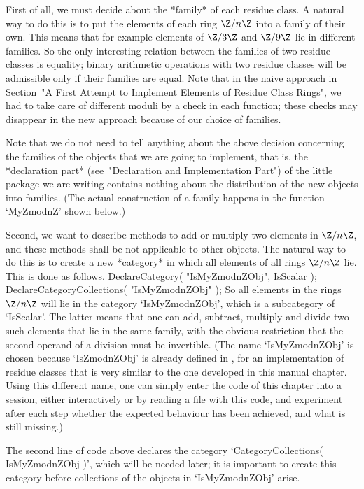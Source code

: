 First of all, we must decide about the *family* of each residue class.
A natural way to do this is to put the elements of each ring $\Z/n\Z$
into a family of their own.
This means that for example elements of $\Z/3\Z$ and $\Z/9\Z$ lie
in different families.
So the only interesting relation between the families of two residue
classes is equality;
binary arithmetic operations with two residue classes will be admissible
only if their families are equal.
Note that in the naive approach in Section~"A First Attempt to Implement
Elements of Residue Class Rings",
we had to take care of different moduli by a check in each function;
these checks may disappear in the new approach because of our choice
of families.

Note that we do not need to tell {\GAP} anything about the above
decision concerning the families of the objects that we are going to
implement,
that is, the *declaration part* (see~"Declaration and Implementation Part")
of the little {\GAP} package we are writing contains nothing about the
distribution of the new objects into families.
(The actual construction of a family happens in the function `MyZmodnZ'
shown below.)

Second, we want to describe methods to add or multiply two elements in
$\Z/n\Z$,
and these methods shall be not applicable to other {\GAP} objects.
The natural way to do this is to create a new *category* in which all
elements of all rings $\Z/n\Z$ lie.
This is done as follows.
\begintt
DeclareCategory( "IsMyZmodnZObj", IsScalar );
DeclareCategoryCollections( "IsMyZmodnZObj" );
\endtt
So all elements in the rings $\Z/n\Z$ will lie in the category
`IsMyZmodnZObj', which is a subcategory of `IsScalar'.
The latter means that one can add, subtract, multiply and divide
two such elements that lie in the same family,
with the obvious restriction that the second operand of a division
must be invertible.
(The name `IsMyZmodnZObj' is chosen because `IsZmodnZObj' is already
defined in {\GAP}, for an implementation of residue classes that is
very similar to the one developed in this manual chapter.
Using this different name, one can simply enter the {\GAP} code of this
chapter into a {\GAP} session, either interactively or by reading a file
with this code, and experiment after each step whether the expected
behaviour has been achieved, and what is still missing.)

The second line of {\GAP} code above declares the category
`CategoryCollections( IsMyZmodnZObj )', which will be needed later;
it is important to create this category before collections of the objects
in `IsMyZmodnZObj' arise.

